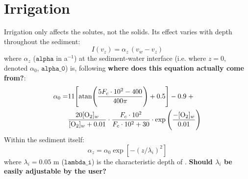 \documentclass[a4paper]{article}
\newcommand{\code}[1]{\texttt{#1}}
\newcommand{\wtf}[1]{\textcolor{Cerulean}{\textbf{#1}}}
\begin{document}

\section{Irrigation}\label{sx:irrigation}

Irrigation only affects the solutes, not the solids. Its effect varies with depth throughout the sediment:
\begin{equation}
I(v_z) = \alpha_z \, (v_w - v_z)
\end{equation}
where $\alpha_z$ ($\code{alpha}$ in a$^{-1}$) at the sediment-water interface (i.e. where $z = 0$, denoted $\alpha_0$, $\code{alpha\_0}$) is, following \wtf{where does this equation actually come from?}:
\begin{equation}
\begin{split}
\alpha_0 = & 11 \Bigg[ \mathrm{atan} \Bigg( \frac{5 F_c \cdot 10^2 - 400}{400 \pi} \Bigg) + 0.5 \Bigg] - 0.9 \; + \\
& \frac{20 [\ce{O2}]_w}{[\ce{O2}]_w + 0.01} \cdot \frac{F_c \cdot 10^2}{F_c \cdot 10^2 + 30} \cdot \exp \Bigg(\frac{-[\ce{O2}]_w}{0.01}\Bigg)
\end{split}
\end{equation}
Within the sediment itself:
\begin{equation}
\alpha_z = \alpha_0 \exp [-(z/\lambda_i)^2]
\end{equation}
where $\lambda_i = 0.05$ m ($\code{lambda\_i}$) is the characteristic depth of \citet{archer_model_2002}. \wtf{Should $\lambda_i$ be easily adjustable by the user?} 


\end{document}

